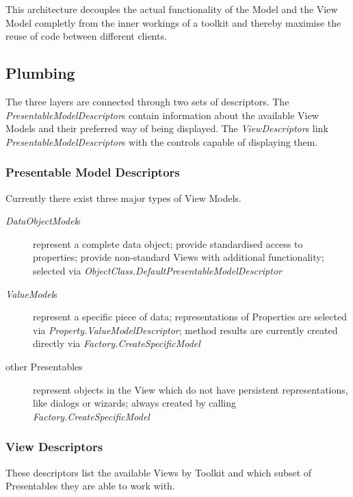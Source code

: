This architecture decouples the actual functionality of the Model and
the View Model completly from the inner workings of a toolkit and
thereby maximise the reuse of code between different clients.

\subsection{Plumbing}

The three layers are connected through two sets of descriptors. The
\emph{PresentableModelDescriptor}s contain information about the
available View Models and their preferred way of being displayed. The
\emph{ViewDescriptor}s link \emph{PresentableModelDescriptor}s with
the controls capable of displaying them.

\subsubsection{Presentable Model Descriptors}

Currently there exist three major types of View Models. 

\begin{description}

\item[\emph{DataObjectModel}s]{represent a complete data object;
provide standardised access to properties; provide non-standard Views
with additional functionality; selected via
\emph{ObjectClass.DefaultPresentableModelDescriptor}}

\item[\emph{ValueModel}s]{represent a specific piece of data;
representations of Properties are selected via
\emph{Property.ValueModelDescriptor}; method results are currently
created directly via \emph{Factory.CreateSpecificModel}}

\item[other Presentables]{represent objects in the View which do not
have persistent representations, like dialogs or wizards; always
created by calling \emph{Factory.CreateSpecificModel}}

\end{description} 

\subsubsection{View Descriptors}

These descriptors list the available Views by Toolkit and which subset
of Presentables they are able to work with.

